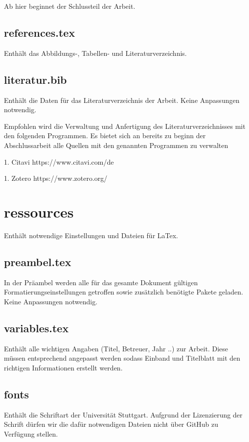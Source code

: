 Ab hier beginnet der Schlussteil der Arbeit.

\subsection*{references.tex}

Enthält das Abbildungs-, Tabellen- und Literaturverzeichnis. 

\subsection*{literatur.bib}

Enthält die Daten für das Literaturverzeichnis der Arbeit. Keine Anpassungen notwendig.

Empfohlen wird die Verwaltung und Anfertigung des Literaturverzeichnisses mit den folgenden Programmen. Es bietet sich an bereits zu beginn der Abschlussarbeit alle Quellen mit den genannten Programmen zu verwalten

1. Citavi https://www.citavi.com/de

1. Zotero https://www.zotero.org/

\newpage

\section*{ressources}

Enthält notwendige Einstellungen und Dateien für LaTex.

\subsection*{preambel.tex}

In der Präambel werden alle für das gesamte Dokument gültigen Formatierungseinstellungen getroffen sowie zusätzlich benötigte Pakete geladen. Keine Anpassungen notwendig.

\subsection*{variables.tex}
\label{section:_E_ressources_variables}

Enthält alle wichtigen Angaben (Titel, Betreuer, Jahr ..) zur Arbeit. Diese müssen entsprechend angepasst werden sodass Einband und Titelblatt mit den richtigen Informationen erstellt werden.

\subsection*{fonts}
Enthält die Schriftart der Universität Stuttgart. Aufgrund der Lizenzierung der Schrift dürfen wir die dafür notwendigen Dateien nicht über GitHub zu Verfügung stellen. 

